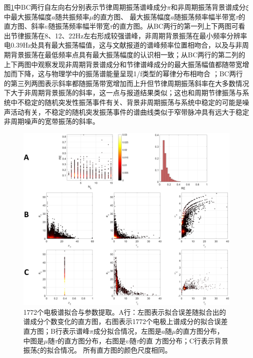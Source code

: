 图\ref{para}中BC两行自左向右分别表示节律周期振荡谱峰成分$\pi$和非周期振荡背景谱成分$\xi$中最大振荡幅度$a$随共振频率$\mu$的直方图、
最大振荡幅度$a$随振荡频率幅半带宽$\tau$的直方图、斜率$\upsilon$随振荡频率幅半带宽$\tau$的直方图。从BC两行的第一列上下两图可看出节律振荡在8、12、22Hz左右形成较强谱峰，非周期背景振荡在最小频率分辨率电0.39Hz处具有最大振荡幅值，这与文献\cite{frauscher2018atlas}报道的谱峰频率位置相吻合，以及与非周期背景振荡在最低频率点具有最大振荡幅度的认识相一致；从BC两行的第二列的上下两图中观察发现非周期背景谱成分和节律谱峰成分的最大振荡幅值都随带宽增加而下降，这与物理学中的振荡谱能量呈现1/f类型的幂律分布相吻合
；BC两行的第三列两图表示斜率都随振荡带宽增加而上升但节律周期振荡斜率在大多数情况下大于非周期背景振荡的斜率，这一点与\cite{pascual1988parametric,amador1989structure,amador1990spatiotemporal}报道结果类似；这也和周期节律振荡与系统中不稳定的随机突发性振荡事件有关、背景非周期振荡与系统中稳定的可能是噪声活动有关，不稳定的随机突发振荡事件的谱曲线类似于窄带脉冲具有远大于稳定非周期噪声的宽带振荡的斜率。
\begin{figure}[!h]
\includegraphics[width=15cm]{pic/xipi/para.png}
\caption{1772个电极谱拟合与参数提取。A行：左图表示拟合误差随拟合出的谱成分个数变化的直方图，右图表示1772个电极上谱成分的拟合误差直方图；B行表示谱峰$\pi$成分拟合情况，左图是$a$随$\mu$的直方图分布，中图是$\mu$随$\tau$的直方图分布，右图是$\upsilon$随$\tau$的直
方图分布；C行表示背景振荡$\xi$的拟合情况。 所有直方图的颜色尺度相同。}
\label{para}
\end{figure}

